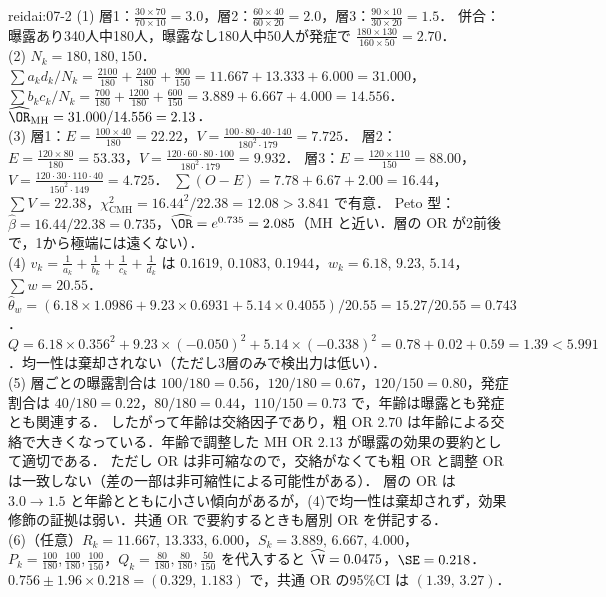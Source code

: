 \begin{kaitou}{reidai:07-2}
(1) 層1：$\frac{30\times70}{70\times10}=3.0$，層2：$\frac{60\times40}{60\times20}=2.0$，層3：$\frac{90\times10}{30\times20}=1.5$．
併合：曝露あり340人中180人，曝露なし180人中50人が発症で $\frac{180\times130}{160\times50}=2.70$．\\
(2) $N_k=180,180,150$．$\sum a_kd_k/N_k=\frac{2100}{180}+\frac{2400}{180}+\frac{900}{150}=11.667+13.333+6.000=31.000$，
$\sum b_kc_k/N_k=\frac{700}{180}+\frac{1200}{180}+\frac{600}{150}=3.889+6.667+4.000=14.556$．$\widehat\OR_{\mathrm{MH}}=31.000/14.556=2.13$．\\
(3) 層1：$E=\frac{100\times40}{180}=22.22$，$V=\frac{100\cdot80\cdot40\cdot140}{180^2\cdot179}=7.725$．
層2：$E=\frac{120\times80}{180}=53.33$，$V=\frac{120\cdot60\cdot80\cdot100}{180^2\cdot179}=9.932$．
層3：$E=\frac{120\times110}{150}=88.00$，$V=\frac{120\cdot30\cdot110\cdot40}{150^2\cdot149}=4.725$．
$\sum(O-E)=7.78+6.67+2.00=16.44$，$\sum V=22.38$，$\chi^2_{\mathrm{CMH}}=16.44^2/22.38=12.08>3.841$ で有意．
Peto 型：$\hat\beta=16.44/22.38=0.735$，$\widehat\OR=e^{0.735}=2.085$（MH と近い．層の OR が2前後で，1から極端には遠くない）．\\
(4) $v_k=\frac1{a_k}+\frac1{b_k}+\frac1{c_k}+\frac1{d_k}$ は $0.1619,\,0.1083,\,0.1944$，$w_k=6.18,\,9.23,\,5.14$，$\sum w=20.55$．
$\hat\theta_w=(6.18\times1.0986+9.23\times0.6931+5.14\times0.4055)/20.55=15.27/20.55=0.743$．
$Q=6.18\times0.356^2+9.23\times(-0.050)^2+5.14\times(-0.338)^2=0.78+0.02+0.59=1.39<5.991$．均一性は棄却されない（ただし3層のみで検出力は低い）．\\
(5) 層ごとの曝露割合は $100/180=0.56$，$120/180=0.67$，$120/150=0.80$，発症割合は $40/180=0.22$，$80/180=0.44$，$110/150=0.73$ で，年齢は曝露とも発症とも関連する．
したがって年齢は交絡因子であり，粗 OR $2.70$ は年齢による交絡で大きくなっている．年齢で調整した MH OR $2.13$ が曝露の効果の要約として適切である．
ただし OR は非可縮なので，交絡がなくても粗 OR と調整 OR は一致しない（差の一部は非可縮性による可能性がある）．
層の OR は $3.0\to1.5$ と年齢とともに小さい傾向があるが，(4)で均一性は棄却されず，効果修飾の証拠は弱い．共通 OR で要約するときも層別 OR を併記する．\\
(6)（任意）$R_k=11.667,\,13.333,\,6.000$，$S_k=3.889,\,6.667,\,4.000$，$P_k=\frac{100}{180},\frac{100}{180},\frac{100}{150}$，$Q_k=\frac{80}{180},\frac{80}{180},\frac{50}{150}$ を代入すると
$\widehat\V=0.0475$，$\SE=0.218$．$0.756\pm1.96\times0.218=(0.329,\,1.183)$ で，共通 OR の95\%CI は $(1.39,\,3.27)$．
\end{kaitou}

